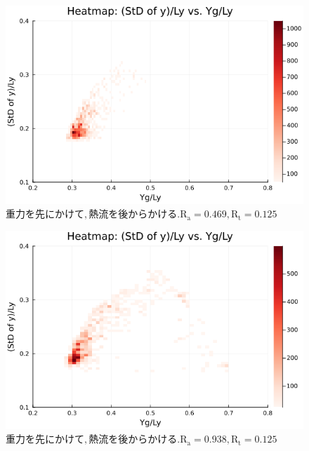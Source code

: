 \begin{figure}[H]
  \centering
  \includegraphics[scale=0.6]{image/RaRtmap_drop_heat/2023-12-21T10:44:57.600_RaRtmap_chi1.265_Ay50_rho0.4_T0.43_dT0.04_Rd0.0_Rt0.125_Ra0.4693845_g0.0003999718779659611_run4.0e7.png}
  \caption{$重力を先にかけて, 熱流を後からかける. \text{R}_\text{a}=0.469,\text{R}_\text{t}=0.125$}
  \label{}
\end{figure}

\begin{figure}[H]
  \centering
  \includegraphics[scale=0.6]{image/RaRtmap_drop_heat/2023-12-21T10:44:57.672_RaRtmap_chi1.265_Ay50_rho0.4_T0.43_dT0.04_Rd0.0_Rt0.125_Ra0.938769_g0.0003999718779659611_run4.0e7.png}
  \caption{$重力を先にかけて, 熱流を後からかける. \text{R}_\text{a}=0.938,\text{R}_\text{t}=0.125$}
  \label{}
\end{figure}

